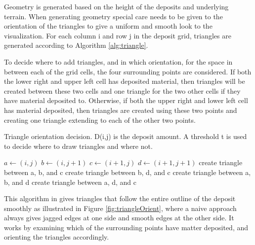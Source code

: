 \documentclass[a4paper,12pt]{report}
\newcommand{\And}{\textbf{ and }}
\begin{document}
Geometry is generated based on the height of the deposits and underlying terrain. When generating geometry special care needs to be given to the orientation of the triangles to give a uniform and smooth look to the visualization. For each column i and row j in the deposit grid, triangles are generated according to Algorithm \ref{alg:triangle}. 

To decide where to add triangles, and in which orientation, for the space in between each of the grid cells, the four surrounding points are considered. If both the lower right and upper left cell has deposited material, then triangles will be created between these two cells and one triangle for the two other cells if they have material deposited to. Otherwise, if both the upper right and lower left cell has material deposited, then triangles are created using these two points and creating one triangle extending to each of the other two points.

\begin{algorithm}

 \caption{Triangle orientation decision. D(i,j) is the deposit amount. A threshold t is used to decide where to draw triangles and where not.}
 \label{alg:triangle}
 \begin{algorithmic}
 
  \State $a \gets (i,j)$
  \State $b \gets (i,j+1)$
  \State $c \gets (i+1,j)$
  \State $d \gets (i+1, j+1)$
  \If {$D(c) > t \And D(b) > t$}
	\State create triangle between a, b, and c
     \EndIf
	\State create triangle between b, d, and c
     \EndIf
  \ElsIf {$D(a) > t \And D(d) > t$}
	\State create triangle between a, b, and d
     \EndIf
	\State create triangle between a, d, and c
     \EndIf
  \EndIf
  \EndFor
  
  \EndFor
  
 \end{algorithmic}

\end{algorithm}


  
This algorithm in gives triangles that follow the entire outline of the deposit smoothly as illustrated in Figure \ref{fig:triangleOrient}, where a naive approach always gives jagged edges at one side and smooth edges at the other side. It works by examining which of the surrounding points have matter deposited, and orienting the triangles accordingly.
\end{document}
